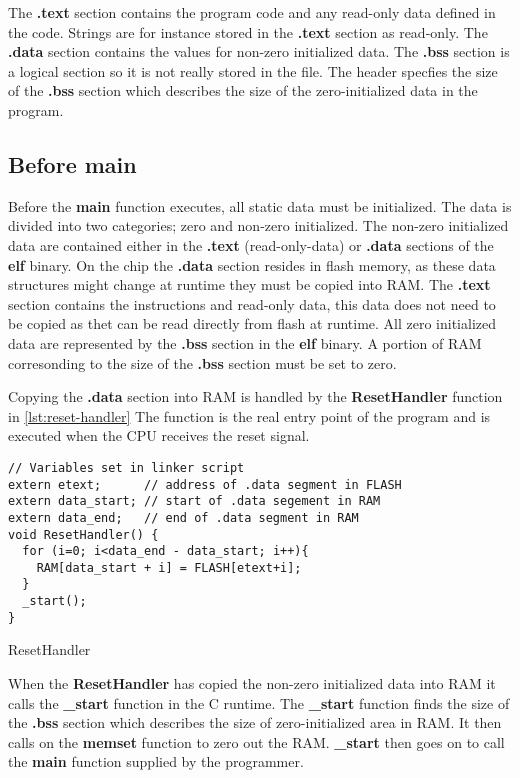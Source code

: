 The \textbf{.text} section contains the program code and any read-only data defined in the code.
Strings are for instance stored in the \textbf{.text} section as read-only.
The \textbf{.data} section contains the values for non-zero initialized data.
The \textbf{.bss} section is a logical section so it is not really stored in the file.
The header specfies the size of the \textbf{.bss} section which describes the size of the zero-initialized data in the program.

\subsection{Before main}

Before the \textbf{main} function executes, all static data must be initialized.
The data is divided into two categories; zero and non-zero initialized.
The non-zero initialized data are contained either in the \textbf{.text} (read-only-data) or \textbf{.data} sections of the \textbf{elf} binary.
On the chip the \textbf{.data} section resides in flash memory, as these data structures might change at runtime they must be copied into RAM.
The \textbf{.text} section contains the instructions and read-only data, this data does not need to be copied as thet can be read directly from flash at runtime.
All zero initialized data are represented by the \textbf{.bss} section in the \textbf{elf} binary.
A portion of RAM corresonding to the size of the \textbf{.bss} section must be set to zero.

Copying the \textbf{.data} section into RAM is handled by the \textbf{ResetHandler} function in \autoref{lst:reset-handler}
The function is the real entry point of the program and is executed when the CPU receives the reset signal.

\begin{listing}[H]
\begin{verbatim}
// Variables set in linker script
extern etext;      // address of .data segment in FLASH
extern data_start; // start of .data segement in RAM
extern data_end;   // end of .data segment in RAM
void ResetHandler() {
  for (i=0; i<data_end - data_start; i++){
    RAM[data_start + i] = FLASH[etext+i];
  }
  _start();
}
\end{verbatim}
\caption{ResetHandler}
\label{lst:reset-handler}
\end{listing}

When the \textbf{ResetHandler} has copied the non-zero initialized data into RAM it calls the \textbf{\_start} function in the C runtime.
The \textbf{\_start} function finds the size of the \textbf{.bss} section which describes the size of zero-initialized area in RAM.
It then calls on the \textbf{memset} function to zero out the RAM.
\textbf{\_start} then goes on to call the \textbf{main} function supplied by the programmer.

